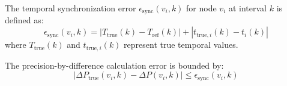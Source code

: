 \begin{definition}
The temporal synchronization error $\epsilon_{\text{sync}}(v_i, k)$ for node $v_i$ at interval $k$ is defined as:
\begin{equation}
\epsilon_{\text{sync}}(v_i, k) = |T_{\text{true}}(k) - T_{\text{ref}}(k)| + |t_{\text{true},i}(k) - t_i(k)|
\end{equation}
where $T_{\text{true}}(k)$ and $t_{\text{true},i}(k)$ represent true temporal values.
\end{definition}

\begin{theorem}
The precision-by-difference calculation error is bounded by:
\begin{equation}
|\Delta P_{\text{true}}(v_i, k) - \Delta P(v_i, k)| \leq \epsilon_{\text{sync}}(v_i, k)
\end{equation}
\end{theorem}

